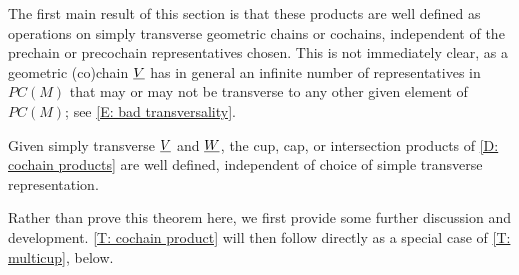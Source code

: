 The first main result of this section is that these products are well defined as operations on simply transverse geometric chains or cochains, independent of the prechain or precochain representatives chosen.
This is not immediately clear, as a geometric (co)chain $\underline{V}$ has in general an infinite number of representatives in $PC(M)$ that may or may not be transverse to any other given element of $PC(M)$; see \cref{E: bad transversality}.

\begin{theorem}\label{T: cochain product}
	Given simply transverse $\underline{V}$ and $\underline{W}$, the cup, cap, or intersection products of \cref{D: cochain products} are well defined, independent of choice of simple transverse representation.
\end{theorem}


Rather than prove this theorem here, we first provide some further discussion and development.
\cref{T: cochain product} will then follow directly as a special case of \cref{T: multicup}, below.

